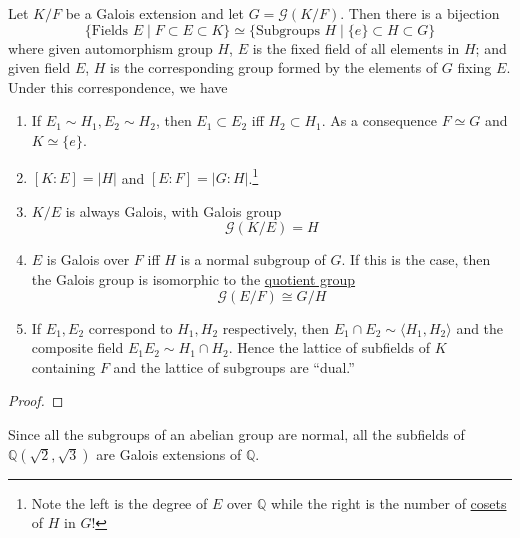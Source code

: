   \begin{theorem}
    \label{thm:fundamental-theorem-of-galois-theory}
    Let $K/F$ be a Galois extension and let $G = \mathcal{G}(K/F)$. Then there is a bijection 
    \begin{equation}
      \{\text{Fields } E \mid F \subset E \subset K \} \simeq \{\text{Subgroups } H \mid \{e\} \subset H \subset G \}
    \end{equation}
    where given automorphism group $H$, $E$ is the fixed field of all elements in $H$; and given field $E$, $H$ is the corresponding group formed by the elements of $G$ fixing $E$. 
    Under this correspondence, we have 
    \begin{enumerate}
      \item If $E_1 \sim H_1, E_2 \sim H_2$, then $E_1 \subset E_2$ iff $H_2 \subset H_1$. As a consequence $F \simeq G$ and $K \simeq \{e\}$. 

      \item $[K:E] = |H|$ and $[E:F] = |G:H|$.\footnote{Note the left is the degree of $E$ over $\mathbb{Q}$ while the right is the number of \hyperref[def:coset]{cosets} of $H$ in $G$!} 
      \item $K/E$ is always Galois, with Galois group 
        \begin{equation}
          \mathcal{G}(K/E) = H
        \end{equation}

      \item $E$ is Galois over $F$ iff $H$ is a normal subgroup of $G$. If this is the case, then the Galois group is isomorphic to the \hyperref[def:quotient-group]{quotient group} 
        \begin{equation}
          \mathcal{G}(E/F) \cong G/H
        \end{equation}

      \item If $E_1, E_2$ correspond to $H_1, H_2$ respectively, then $E_1 \cap E_2 \sim \langle H_1, H_2 \rangle$ and the composite field $E_1 E_2 \sim H_1 \cap H_2$. Hence the lattice of subfields of $K$ containing $F$ and the lattice of subgroups are ``dual.'' 
    \end{enumerate}
  \end{theorem}
  \begin{proof}
    
  \end{proof}

  \begin{example}[]
    \label{ex:since-subgroups-abelian-group-normal}
    Since all the subgroups of an abelian group are normal, all the subfields of $\mathbb{Q}(\sqrt{2}, \sqrt{3})$ are Galois extensions of $\mathbb{Q}$. 
  \end{example}

